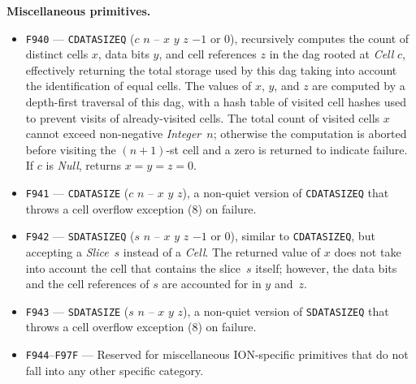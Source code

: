 \documentclass[12pt,oneside]{article}
\def\makepoint#1{\medbreak\noindent{\bf #1.\ }}
\def\nxsubpoint{\refstepcounter{subsubsection}%
  \smallbreak\makepoint{\thesubsubsection}}
\def\emb#1{\textbf{#1.}}
\begin{document}
\nxsubpoint\emb{Miscellaneous primitives}
\begin{itemize}
\item {\tt F940} --- {\tt CDATASIZEQ} ($c$ $n$ -- $x$ $y$ $z$ $-1$ or $0$), recursively computes the count of distinct cells $x$, data bits $y$, and cell references $z$ in the dag rooted at {\em Cell\/} $c$, effectively returning the total storage used by this dag taking into account the identification of equal cells. The values of $x$, $y$, and $z$ are computed by a depth-first traversal of this dag, with a hash table of visited cell hashes used to prevent visits of already-visited cells. The total count of visited cells $x$ cannot exceed non-negative {\em Integer\/}~$n$; otherwise the computation is aborted before visiting the $(n+1)$-st cell and a zero is returned to indicate failure. If $c$ is {\em Null}, returns $x=y=z=0$.
\item {\tt F941} --- {\tt CDATASIZE} ($c$ $n$ -- $x$ $y$ $z$), a non-quiet version of {\tt CDATASIZEQ} that throws a cell overflow exception (8) on failure.
\item {\tt F942} --- {\tt SDATASIZEQ} ($s$ $n$ -- $x$ $y$ $z$ $-1$ or $0$), similar to {\tt CDATASIZEQ}, but accepting a {\em Slice\/}~$s$ instead of a {\em Cell\/}. The returned value of $x$ does not take into account the cell that contains the slice~$s$ itself; however, the data bits and the cell references of $s$ are accounted for in $y$ and~$z$.
\item {\tt F943} --- {\tt SDATASIZE} ($s$ $n$ -- $x$ $y$ $z$), a non-quiet version of {\tt SDATASIZEQ} that throws a cell overflow exception (8) on failure.
\item {\tt F944}--{\tt F97F} --- Reserved for miscellaneous ION-specific primitives that do not fall into any other specific category.
\end{itemize}
\end{document}
